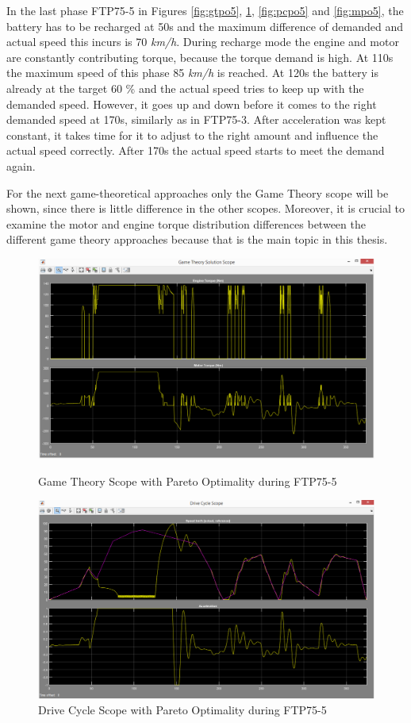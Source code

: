 In the last phase FTP75-5 in Figures \ref{fig:gtpo5}, \ref{fig:dcpo5}, \ref{fig:pcpo5} and \ref{fig:mpo5}, the battery has to be recharged at 50s and the maximum difference of demanded and actual speed this incurs is 70 \textit{km/h}. During recharge mode the engine and motor are constantly contributing torque, because the torque demand is high. At 110s the maximum speed of this phase 85 \textit{km/h} is reached. At 120s the battery is already at the target 60 \% and the actual speed tries to keep up with the demanded speed. However, it goes up and down before it comes to the right demanded speed at 170s, similarly as in FTP75-3. After acceleration was kept constant, it takes time for it to adjust to the right amount and influence the actual speed correctly. After 170s the actual speed starts to meet the demand again. 

For the next game-theoretical approaches only the Game Theory scope will be shown, since there is little difference in the other scopes. Moreover, it is crucial to examine the motor and engine torque distribution differences between the different game theory approaches because that is the main topic in this thesis.

\begin{figure}[hp]
\centering
\includegraphics[scale=0.45]{figures/Pareto/FTP75-5/gameTheory05Juli}
\caption{Game Theory Scope with Pareto Optimality during FTP75-5}
\label{fig:gtpo5}
\includegraphics[scale=0.41]{figures/Pareto/FTP75-5/driveCycle05Juli}
\caption{Drive Cycle Scope with Pareto Optimality during FTP75-5}
\label{fig:dcpo5}
\end{figure}

